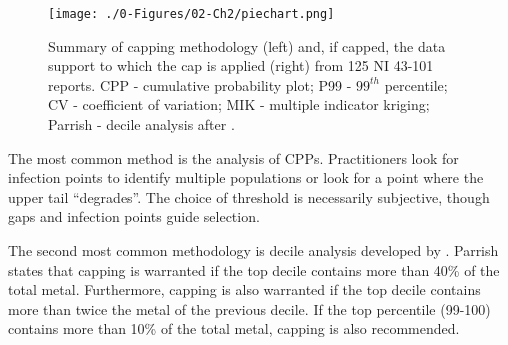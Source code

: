 \begin{figure}[htb!]
    \centering
    \texttt{[image: ./0-Figures/02-Ch2/piechart.png]}
    \caption{Summary of capping methodology (left) and, if capped, the data support to which the cap is applied (right) from 125 \gls{NI} 43-101 reports. CPP - cumulative probability plot; P99 - $99^{th}$ percentile; CV - coefficient of variation; MIK - multiple indicator kriging; Parrish - decile analysis after \cite{parrish1997geologist}.}
    \label{fig:piechart}
\end{figure}

The most common method is the analysis of \glspl{CPP}. Practitioners look for infection points to identify multiple populations or look for a point where the upper tail ``degrades''. The choice of threshold is necessarily subjective, though gaps and infection points guide selection.


The second most common methodology is decile analysis developed by \cite{parrish1997geologist}. Parrish states that capping is warranted if the top decile contains more than 40\% of the total metal. Furthermore, capping is also warranted if the top decile contains more than twice the metal of the previous decile. If the top percentile (99-100) contains more than 10\% of the total metal, capping is also recommended.



